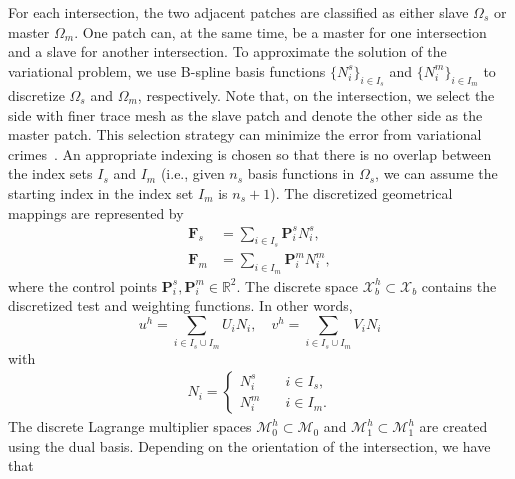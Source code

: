For each intersection, the two adjacent patches are classified as either slave $\Omega_s$ or master $\Omega_m$. One patch can, at the same time, be a master for one intersection and a slave for another intersection. To approximate the solution of the variational problem, we use B-spline basis functions $\{N^s_i\}_{i\in{I_s}}$ and $\{N^m_i\}_{i\in{I_m}}$ to discretize $\Omega_s$ and $\Omega_m$, respectively. Note that, on the intersection, we select the side with finer trace mesh as the slave patch and denote the other side as the master patch. This selection strategy can minimize the error from variational crimes~\cite{strang1973analysis,brenner_mathematical_2007}.
An appropriate indexing is chosen so that there is no overlap between the index sets $I_s$ and $I_m$ (i.e., given $n_s$ basis functions in $\Omega_s$, we can assume the starting index in the index set $I_m$ is $n_s+1$). The discretized geometrical mappings are represented by
\begin{align}
  \mathbf{F}_s & =\sum_{i\in{I_s}}\mathbf{P}_i^sN_i^s, \\
  \mathbf{F}_m & =\sum_{i\in{I_m}}\mathbf{P}_i^mN_i^m,
\end{align}
where the control points $\mathbf{P}_i^s,\mathbf{P}_i^m\in\mathbb{R}^2$. The discrete space $\mathcal{X}_b^h \subset \mathcal{X}_b$ contains the discretized test and weighting functions. In other words,
\begin{equation}
  u^h=\sum_{i\in{I_s\cup{}I_m}}U_iN_i,\quad v^h=\sum_{i\in{I_s\cup{}I_m}}V_iN_i
\end{equation}
with
\begin{align}
  N_i=
  \begin{cases}
    N_i^s \quad & i\in{I_s}, \\
    N_i^m \quad & i\in{I_m}.
  \end{cases}
\end{align}
The discrete Lagrange multiplier spaces $\mathcal{M}_0^h \subset \mathcal{M}_0$ and $\mathcal{M}_1^h \subset \mathcal{M}_1^h$ are created using the dual basis. Depending on the orientation of the intersection, we have that
